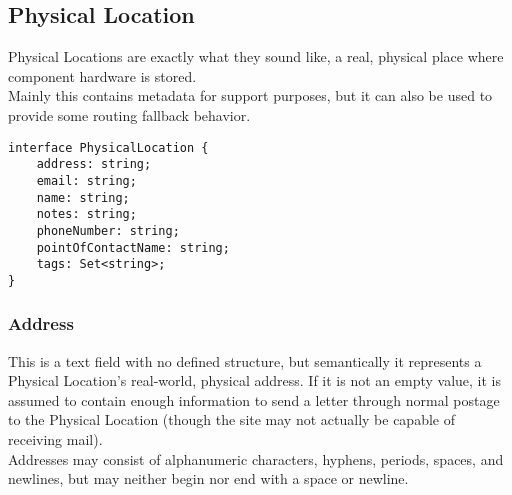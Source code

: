 %
%

\subsection{Physical Location}
Physical Locations are exactly what they sound like, a real, physical place
where component hardware is stored.\\
Mainly this contains metadata for support purposes, but it can also be used
to provide some routing fallback behavior.

\begin{codelisting}
\begin{verbatim}
interface PhysicalLocation {
	address: string;
	email: string;
	name: string;
	notes: string;
	phoneNumber: string;
	pointOfContactName: string;
	tags: Set<string>;
}
\end{verbatim}
\end{codelisting}

\subsubsection{Address}
This is a text field with no defined structure, but semantically it represents
a Physical Location's real-world, physical address. If it is not an empty
value, it is assumed to contain enough information to send a letter through
normal postage to the Physical Location (though the site may not actually be
capable of receiving mail).\\
Addresses may consist of alphanumeric characters, hyphens, periods, spaces, and
newlines, but may neither begin nor end with a space or newline.

